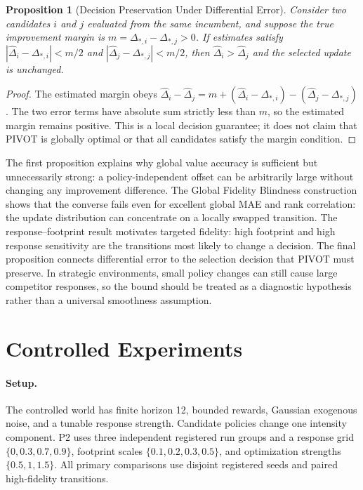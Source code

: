 \documentclass{article} %
\newtheorem{proposition}{Proposition}
\begin{document}
\begin{proposition}[Decision Preservation Under Differential Error]
Consider two candidates $i$ and $j$ evaluated from the same incumbent, and
suppose the true improvement margin is
$m=\Delta_{*,i}-\Delta_{*,j}>0$. If estimates satisfy
$|\widehat\Delta_i-\Delta_{*,i}|<m/2$ and
$|\widehat\Delta_j-\Delta_{*,j}|<m/2$, then
$\widehat\Delta_i>\widehat\Delta_j$ and the selected update is unchanged.
\end{proposition}
\begin{proof}
The estimated margin obeys
$\widehat\Delta_i-\widehat\Delta_j
=m+(\widehat\Delta_i-\Delta_{*,i})-(\widehat\Delta_j-\Delta_{*,j})$.
The two error terms have absolute sum strictly less than $m$, so the
estimated margin remains positive. This is a local decision guarantee; it
does not claim that PIVOT is globally optimal or that all candidates satisfy
the margin condition.
\end{proof}

The first proposition explains why global value accuracy is sufficient but
unnecessarily strong: a policy-independent offset can be arbitrarily large
without changing any improvement difference. The Global Fidelity Blindness
construction shows that the converse fails even for excellent global MAE and
rank correlation: the update distribution can concentrate on a locally swapped
transition. The response--footprint result motivates targeted fidelity: high
footprint and high response sensitivity are the transitions most likely to
change a decision. The final proposition connects differential error to the
selection decision that PIVOT must preserve. In strategic environments, small policy changes
can still cause large competitor responses, so the bound should be treated as a
diagnostic hypothesis rather than a universal smoothness assumption.

\section{Controlled Experiments}
\paragraph{Setup.}
The controlled world has finite horizon 12, bounded rewards, Gaussian
exogenous noise, and a tunable response strength. Candidate policies change one
intensity component. P2 uses three independent registered run groups and a
response grid $\{0,0.3,0.7,0.9\}$, footprint scales
$\{0.1,0.2,0.3,0.5\}$, and optimization strengths
$\{0.5,1,1.5\}$. All primary comparisons use disjoint registered seeds and
paired high-fidelity transitions.
\end{document}
